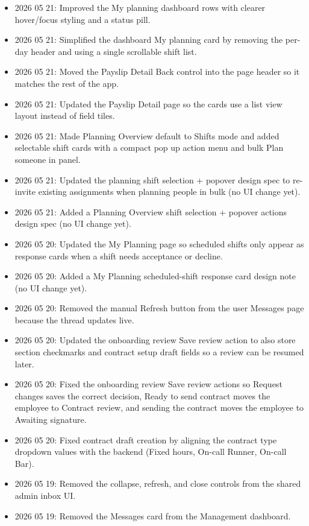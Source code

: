 \documentclass[11pt]{article}
\begin{document}
\begin{itemize}
    \item 2026 05 21: Improved the My planning dashboard rows with clearer hover/focus styling and a status pill.
    \item 2026 05 21: Simplified the dashboard My planning card by removing the per-day header and using a single scrollable shift list.
    \item 2026 05 21: Moved the Payslip Detail Back control into the page header so it matches the rest of the app.
    \item 2026 05 21: Updated the Payslip Detail page so the cards use a list view layout instead of field tiles.
    \item 2026 05 21: Made Planning Overview default to Shifts mode and added selectable shift cards with a compact pop up action menu and bulk Plan someone in panel.
    \item 2026 05 21: Updated the planning shift selection + popover design spec to re-invite existing assignments when planning people in bulk (no UI change yet).
    \item 2026 05 21: Added a Planning Overview shift selection + popover actions design spec (no UI change yet).
    \item 2026 05 20: Updated the My Planning page so scheduled shifts only appear as response cards when a shift needs acceptance or decline.
    \item 2026 05 20: Added a My Planning scheduled-shift response card design note (no UI change yet).
    \item 2026 05 20: Removed the manual Refresh button from the user Messages page because the thread updates live.
    \item 2026 05 20: Updated the onboarding review Save review action to also store section checkmarks and contract setup draft fields so a review can be resumed later.
    \item 2026 05 20: Fixed the onboarding review Save review actions so Request changes saves the correct decision, Ready to send contract moves the employee to Contract review, and sending the contract moves the employee to Awaiting signature.
    \item 2026 05 20: Fixed contract draft creation by aligning the contract type dropdown values with the backend (Fixed hours, On-call Runner, On-call Bar).
    \item 2026 05 19: Removed the collapse, refresh, and close controls from the shared admin inbox UI.
    \item 2026 05 19: Removed the Messages card from the Management dashboard.

\end{itemize}
\end{document}
